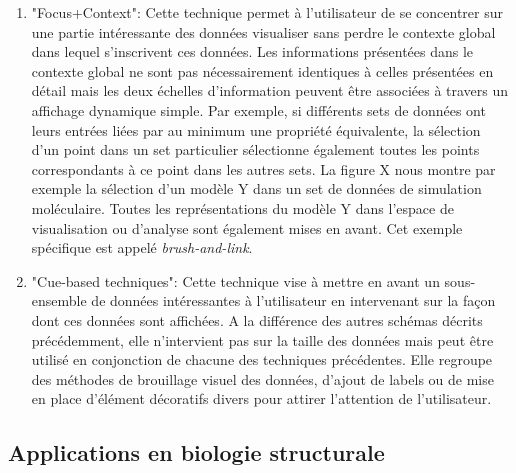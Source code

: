 \begin{enumerate}
    \item "Focus+Context": Cette technique permet à l'utilisateur de se concentrer sur une partie intéressante des données visualiser sans perdre le contexte global dans lequel s'inscrivent ces données. Les informations présentées dans le contexte global ne sont pas nécessairement identiques à celles présentées en détail mais les deux échelles d'information peuvent être associées à travers un affichage dynamique simple. Par exemple, si différents sets de données ont leurs entrées liées par au minimum une propriété équivalente, la sélection d'un point dans un set particulier sélectionne également toutes les points correspondants à ce point dans les autres sets. La figure X nous montre par exemple la sélection d'un modèle Y dans un set de données de simulation moléculaire. Toutes les représentations du modèle Y dans l'espace de visualisation ou d'analyse sont également mises en avant. Cet exemple spécifique est appelé \textit{brush-and-link}.
    \item "Cue-based techniques": Cette technique vise à mettre en avant un sous-ensemble de données intéressantes à l'utilisateur en intervenant sur la façon dont ces données sont affichées. A la différence des autres schémas décrits précédemment, elle n'intervient pas sur la taille des données mais peut être utilisé en conjonction de chacune des techniques précédentes. Elle regroupe des méthodes de brouillage visuel des données, d'ajout de labels ou de mise en place d'élément décoratifs divers pour attirer l'attention de l'utilisateur.
\end{enumerate}

\subsection{Applications en biologie structurale}
\label{Sec:visuAnalyticsStructBio}


